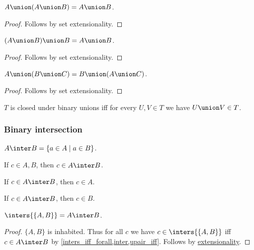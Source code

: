 \begin{proposition}\label{union_absorb_left}
    $A\union (A\union B) = A\union B$.
\end{proposition}
\begin{proof}
    Follows by set extensionality.
\end{proof}

\begin{proposition}\label{union_absorb_right}
    $(A\union B)\union B = A\union B$.
\end{proposition}
\begin{proof}
    Follows by set extensionality.
\end{proof}

\begin{proposition}\label{union_comm_left}
    $A\union (B\union C) = B\union (A\union C)$.
\end{proposition}
\begin{proof}
    Follows by set extensionality.
\end{proof}

\begin{abbreviation}\label{closedunderunion}
    $T$ is closed under binary unions
    iff for every $U,V\in T$ we have $U\union V\in T$.
\end{abbreviation}


\subsubsection{Binary intersection}

\begin{definition}\label{inter}
    $A\inter B = \{ a \in A \mid a\in B\}$.
\end{definition}

\begin{proposition}\label{inter_intro}
    If $c\in A, B$, then $c\in A\inter B$.
\end{proposition}

\begin{proposition}\label{inter_elim_left}
    If $c\in A\inter B$, then $c\in A$.
\end{proposition}

\begin{proposition}\label{inter_elim_right}
    If $c\in A\inter B$, then $c\in B$.
\end{proposition}

\begin{proposition}\label{inter_as_inters}
    $\inters{\{A,B\}} = A\inter B$.
\end{proposition}
\begin{proof}
    $\{A,B\}$ is inhabited.
    Thus for all $c$ we have $c\in\inters{\{A,B\}}$ iff $c\in A\inter B$
        by \cref{inters_iff_forall,inter,upair_iff}.
    Follows by \hyperref[setext]{extensionality}.
\end{proof}


